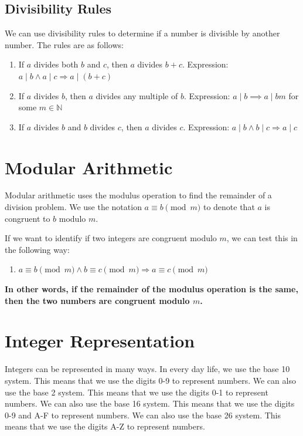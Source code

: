 \documentclass[11pt]{article}
\begin{document}
\subsection{Divisibility Rules}
\label{sec:orgddf0e0b}
We can use divisibility rules to determine if a number is divisible by another number. The rules are as follows:
\begin{enumerate}
\item If \(a\) divides both \(b\) and \(c\), then \(a\) divides \(b+c\). Expression: \(a \mid b \land a \mid c \Rightarrow a \mid (b+c)\)
\item If \(a\) divides \(b\), then \(a\) divides any multiple of \(b\). Expression: \(a \mid b \implies a \mid bm\) for some \(m \in \mathbb{N}\)
\item If \(a\) divides \(b\) and \(b\) divides \(c\), then \(a\) divides \(c\). Expression: \(a \mid b \land b \mid c \Rightarrow a \mid c\)
\end{enumerate}

\section{Modular Arithmetic}
\label{sec:org1fe8803}
Modular arithmetic uses the modulus operation to find the remainder of a division problem. We use the notation \(a \equiv b \pmod{m}\) to denote that \(a\) is congruent to \(b\) modulo \(m\).

If we want to identify if two integers are congruent modulo \(m\), we can test this in the following way:
\begin{enumerate}
\item \(a \equiv b \pmod{m} \land b \equiv c \pmod{m} \Rightarrow a \equiv c \pmod{m}\)
\end{enumerate}

\textbf{In other words, if the remainder of the modulus operation is the same, then the two numbers are congruent modulo \(m\).}


\section{Integer Representation}
\label{sec:orgf50aabf}
Integers can be represented in many ways. In every day life, we use the base 10 system. This means that we use the digits 0-9 to represent numbers. We can also use the base 2 system. This means that we use the digits 0-1 to represent numbers. We can also use the base 16 system. This means that we use the digits 0-9 and A-F to represent numbers. We can also use the base 26 system. This means that we use the digits A-Z to represent numbers.
\end{document}
